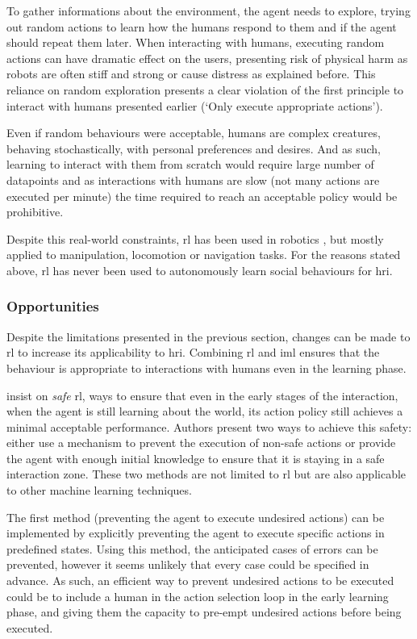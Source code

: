 	To gather informations about the environment, the agent needs to explore, trying out random actions to learn how the humans respond to them and if the agent should repeat them later. When interacting with humans, executing random actions can have dramatic effect on the users, presenting risk of physical harm as robots are often stiff and strong or cause distress as explained before. This reliance on random exploration presents a clear violation of the first principle to interact with humans presented earlier (`Only execute appropriate actions').
	
	Even if random behaviours were acceptable, humans are complex creatures, behaving stochastically, with personal preferences and desires. And as such, learning to interact with them from scratch would require large number of datapoints and as interactions with humans are slow (not many actions are executed per minute) the time required to reach an acceptable policy would be prohibitive. 
	
	Despite this real-world constraints, \gls{rl} has been used in robotics \citep{kober2013reinforcement}, but mostly applied to manipulation, locomotion or navigation tasks. For the reasons stated above, \gls{rl} has never been used to autonomously learn social behaviours for \gls{hri}. 
	
	\subsubsection{Opportunities}  
	Despite the limitations presented in the previous section, changes can be made to \gls{rl} to increase its applicability to \gls{hri}. Combining \gls{rl} and \gls{iml} ensures that the behaviour is appropriate to interactions with humans even in the learning phase.
	
	\cite{garcia2015comprehensive} insist on \textit{safe} \gls{rl}, ways to ensure that even in the early stages of the interaction, when the agent is still learning about the world, its action policy still achieves a minimal acceptable performance. Authors present two ways to achieve this safety: either use a mechanism to prevent the execution of non-safe actions or provide the agent with enough initial knowledge to ensure that it is staying in a safe interaction zone. These two methods are not limited to \gls{rl} but are also applicable to other machine learning techniques. 
	
	The first method (preventing the agent to execute undesired actions) can be implemented by explicitly preventing the agent to execute specific actions in predefined states. Using this method, the anticipated cases of errors can be prevented, however it seems unlikely that every case could be specified in advance. As such, an efficient way to prevent undesired actions to be executed could be to include a human in the action selection loop in the early learning phase, and giving them the capacity to pre-empt undesired actions before being executed. 
	

